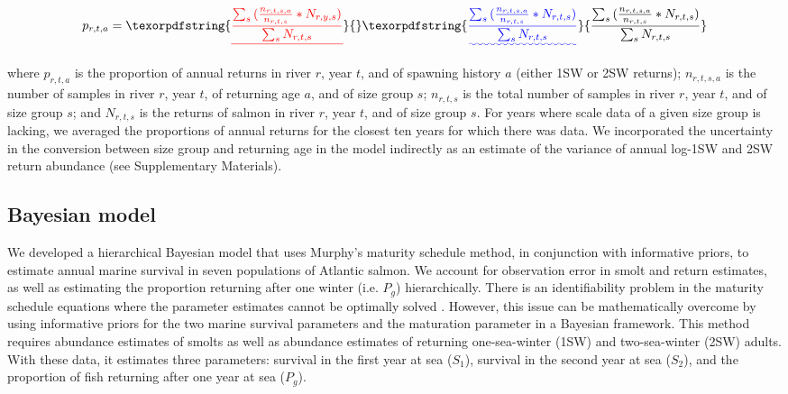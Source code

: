 \documentclass[12pt]{article}
\newcommand{\So}{$S_{1}$\xspace}
\newcommand{\St}{$S_{2}$\xspace}
\newcommand{\Pg}{$P_g$\xspace}
\providecommand{\DIFaddtex}[1]{{\protect\color{blue}\uwave{#1}}} %
\providecommand{\DIFdeltex}[1]{{\protect\color{red}\sout{#1}}}                      %
\providecommand{\DIFaddbegin}{} %
\providecommand{\DIFaddend}{} %
\providecommand{\DIFdelbegin}{} %
\providecommand{\DIFdelend}{} %
\providecommand{\DIFadd}[1]{\texorpdfstring{\DIFaddtex{#1}}{#1}} %
\providecommand{\DIFdel}[1]{\texorpdfstring{\DIFdeltex{#1}}{}} %
\begin{document}
\begin{equation}
    p_{r,t,a} = \DIFdelbegin \DIFdel{\frac{\sum_{s}{(\frac{n_{r,t,s,a}}{n_{r,t,s}} * N_{r,y,s})}}{\sum_{s}{N_{r,t,s}}}
}\DIFdelend \DIFaddbegin \DIFadd{\frac{\sum_{s}{(\frac{n_{r,t,s,a}}{n_{r,t,s}} * N_{r,t,s})}}{\sum_{s}{N_{r,t,s}}}
}\DIFaddend \end{equation}

where $p_{r,t,a}$ is the proportion of annual returns in river $r$, year $t$,
and of spawning history $a$ (either 1SW or 2SW returns); $n_{r,t,s,a}$ is the
number of samples in river $r$, year $t$, of returning age $a$, and of size
group $s$; $n_{r,t,s}$ is the total number of samples in river $r$, year $t$,
and of size group $s$; and $N_{r,t,s}$ is the returns of salmon
in river $r$, year $t$, and of size group $s$.
For years where scale data of a given size group is lacking,
we averaged the proportions of annual returns
for the closest ten years for which there was data.
We incorporated the uncertainty in the conversion between
size group and returning age in the model indirectly as an estimate
of the variance of annual log-1SW and 2SW return abundance (see Supplementary Materials).

\subsection*{Bayesian model}

We developed a hierarchical Bayesian model that uses Murphy's maturity
schedule method, in conjunction with informative priors, to estimate annual
marine survival in seven populations of Atlantic salmon. We account for
observation error in smolt and return estimates, as well as estimating the
proportion returning after one winter (i.e. \Pg) hierarchically.
There is an identifiability problem in the maturity schedule equations where
the parameter estimates cannot be optimally solved \citep{Chaput2003a}.
However, this issue can be mathematically overcome by
using informative priors for the two marine survival parameters and the maturation
parameter in a Bayesian framework.
This method requires abundance estimates of smolts as well as abundance estimates
of returning one-sea-winter (1SW) and two-sea-winter (2SW) adults. With these data,
it estimates three parameters: survival in the first year at sea (\So), survival
in the second year at sea (\St), and the proportion of fish returning after one
year at sea (\Pg).
\end{document}
